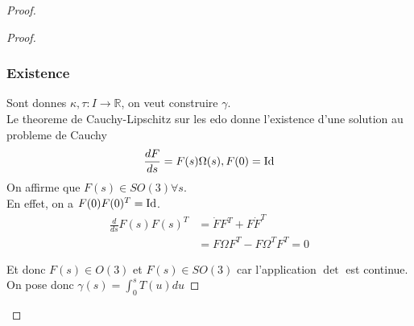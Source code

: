 \documentclass[../main.tex]{subfiles}
\begin{document}
\begin{proof}
\begin{proof}
\subsubsection*{Existence}
Sont donnes $\kappa, \tau: I \to \mathbb{R}$, on veut construire $\gamma$.\\
Le theoreme de Cauchy-Lipschitz sur les edo donne l'existence d'une solution au probleme de Cauchy
\[ 
	\frac{dF}{ds}= F( s) \Omega( s) , F( 0) =\operatorname{Id}
\]
On affirme que $F( s) \in SO( 3) \forall s$.\\
En effet, on a $F( 0) F( 0) ^{T}= \operatorname{Id}$.\\
\begin{align*}
	\frac{d}{ds}F( s) F( s) ^{T}&= \dot F F^{T}+ F \dot F^{T}\\
				    &= F\Omega F^{T}- F\Omega^{T}F^{T}=0

\end{align*}

Et donc $F( s)\in O( 3)  $ et $F( s)\in SO( 3)  $ car l'application $\det$ est continue.\\
On pose donc $\gamma( s) = \int_{ 0 }^{ s }T( u) du$ 


\end{proof}

	
	




\end{proof}
\end{document}

